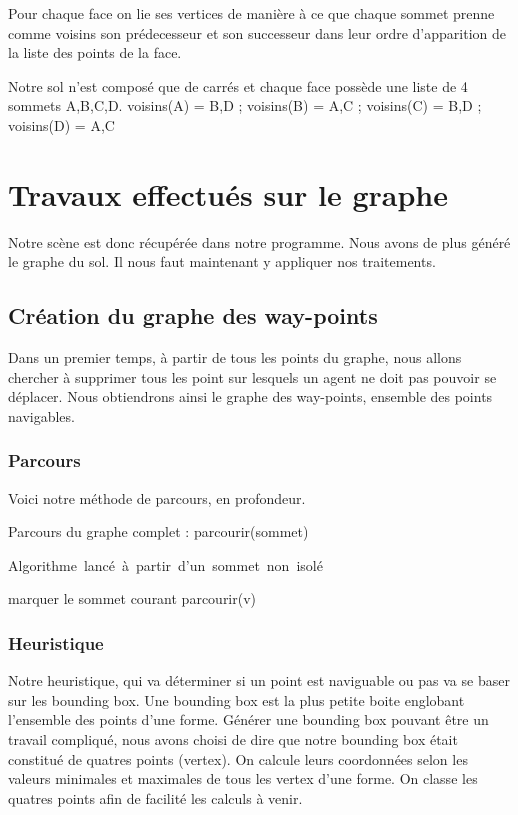 \documentclass[a4paper,12pt]{report}
\begin{document}
Pour chaque face on lie ses vertices de manière à ce que chaque sommet prenne comme voisins son prédecesseur et son successeur dans leur ordre d'apparition de la liste des points de la face.

Notre sol n'est composé que de carrés et chaque face possède une liste de 4 sommets A,B,C,D.
voisins(A) = {B,D} ;  voisins(B) = {A,C} ; voisins(C) = {B,D} ; voisins(D) = {A,C}

\section{Travaux effectués sur le graphe}

Notre scène est donc récupérée dans notre programme. Nous avons de plus généré le graphe du sol. Il nous faut maintenant y appliquer nos traitements.

\subsection{Création du graphe des way-points}

Dans un premier temps, à partir de tous les points du graphe, nous allons chercher à supprimer tous les point sur lesquels un agent ne doit pas pouvoir se déplacer. Nous obtiendrons ainsi le graphe des way-points, ensemble des points navigables.

\subsubsection{Parcours}

Voici notre méthode de parcours, en profondeur. 

\begin{algorithm}[h]
\caption{Parcours du graphe complet : parcourir(sommet)}
\label{parcours_graphe}
\mbox{Algorithme lancé à partir d'un sommet non isolé}
\begin{algorithmic}[1]
  \STATE marquer le sommet courant
    \STATE parcourir(v)
  \ENDFOR
\ENDIF
\end{algorithmic}
\end{algorithm}

\subsubsection{Heuristique}

Notre heuristique, qui va déterminer si un point est naviguable ou pas va se baser sur les bounding box. Une bounding box est la plus petite boite englobant l'ensemble des points d'une forme. Générer une bounding box pouvant être un travail compliqué, nous avons choisi de dire que notre bounding box était constitué de quatres points (vertex). On calcule leurs coordonnées selon les valeurs minimales et maximales de tous les vertex d'une forme. On classe les quatres points afin de facilité les calculs à venir.
\end{document}
